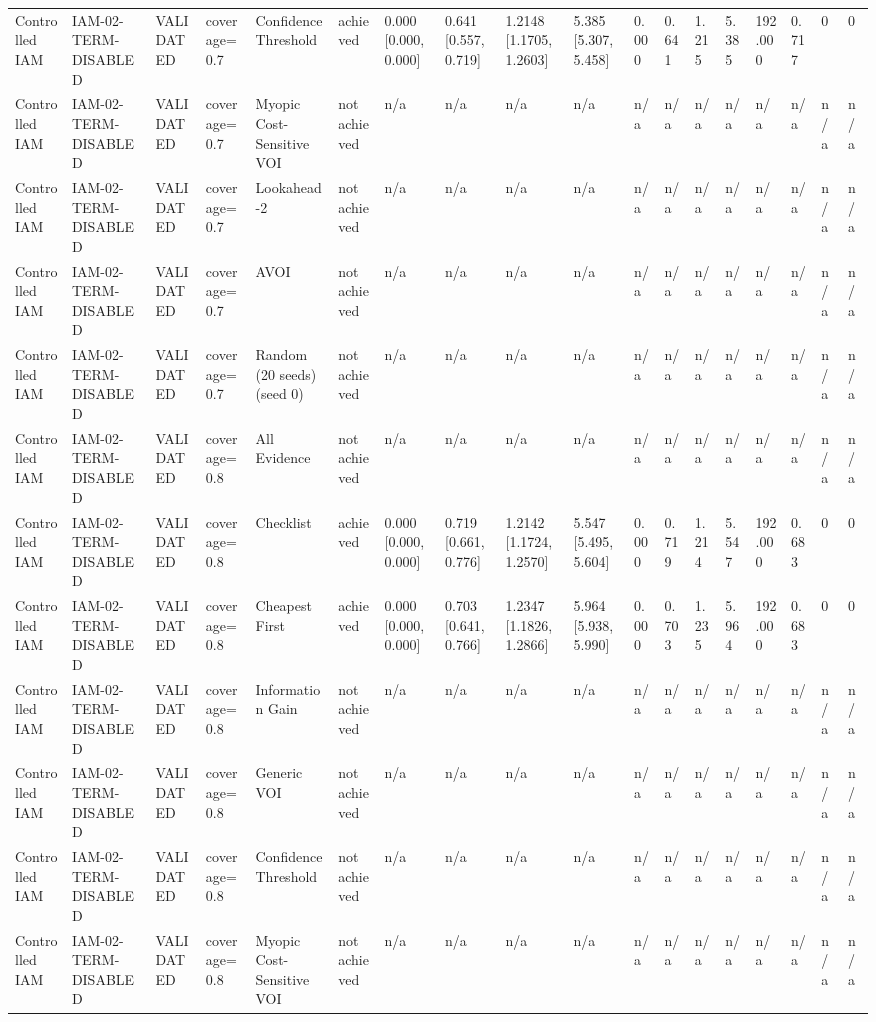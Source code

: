 \begin{table}[!ht]
{\begin{tabular}{llllllllllllllllll}
Controlled IAM & IAM-02-TERM-DISABLED & VALIDATED & coverage=0.7 & Confidence Threshold & achieved & 0.000 [0.000, 0.000] & 0.641 [0.557, 0.719] & 1.2148 [1.1705, 1.2603] & 5.385 [5.307, 5.458] & 0.000 & 0.641 & 1.215 & 5.385 & 192.000 & 0.717 & 0 & 0 \\
Controlled IAM & IAM-02-TERM-DISABLED & VALIDATED & coverage=0.7 & Myopic Cost-Sensitive VOI & not achieved & n/a & n/a & n/a & n/a & n/a & n/a & n/a & n/a & n/a & n/a & n/a & n/a \\
Controlled IAM & IAM-02-TERM-DISABLED & VALIDATED & coverage=0.7 & Lookahead-2 & not achieved & n/a & n/a & n/a & n/a & n/a & n/a & n/a & n/a & n/a & n/a & n/a & n/a \\
Controlled IAM & IAM-02-TERM-DISABLED & VALIDATED & coverage=0.7 & AVOI & not achieved & n/a & n/a & n/a & n/a & n/a & n/a & n/a & n/a & n/a & n/a & n/a & n/a \\
Controlled IAM & IAM-02-TERM-DISABLED & VALIDATED & coverage=0.7 & Random (20 seeds) (seed 0) & not achieved & n/a & n/a & n/a & n/a & n/a & n/a & n/a & n/a & n/a & n/a & n/a & n/a \\
Controlled IAM & IAM-02-TERM-DISABLED & VALIDATED & coverage=0.8 & All Evidence & not achieved & n/a & n/a & n/a & n/a & n/a & n/a & n/a & n/a & n/a & n/a & n/a & n/a \\
Controlled IAM & IAM-02-TERM-DISABLED & VALIDATED & coverage=0.8 & Checklist & achieved & 0.000 [0.000, 0.000] & 0.719 [0.661, 0.776] & 1.2142 [1.1724, 1.2570] & 5.547 [5.495, 5.604] & 0.000 & 0.719 & 1.214 & 5.547 & 192.000 & 0.683 & 0 & 0 \\
Controlled IAM & IAM-02-TERM-DISABLED & VALIDATED & coverage=0.8 & Cheapest First & achieved & 0.000 [0.000, 0.000] & 0.703 [0.641, 0.766] & 1.2347 [1.1826, 1.2866] & 5.964 [5.938, 5.990] & 0.000 & 0.703 & 1.235 & 5.964 & 192.000 & 0.683 & 0 & 0 \\
Controlled IAM & IAM-02-TERM-DISABLED & VALIDATED & coverage=0.8 & Information Gain & not achieved & n/a & n/a & n/a & n/a & n/a & n/a & n/a & n/a & n/a & n/a & n/a & n/a \\
Controlled IAM & IAM-02-TERM-DISABLED & VALIDATED & coverage=0.8 & Generic VOI & not achieved & n/a & n/a & n/a & n/a & n/a & n/a & n/a & n/a & n/a & n/a & n/a & n/a \\
Controlled IAM & IAM-02-TERM-DISABLED & VALIDATED & coverage=0.8 & Confidence Threshold & not achieved & n/a & n/a & n/a & n/a & n/a & n/a & n/a & n/a & n/a & n/a & n/a & n/a \\
Controlled IAM & IAM-02-TERM-DISABLED & VALIDATED & coverage=0.8 & Myopic Cost-Sensitive VOI & not achieved & n/a & n/a & n/a & n/a & n/a & n/a & n/a & n/a & n/a & n/a & n/a & n/a \\

\end{tabular}}
\end{table}

